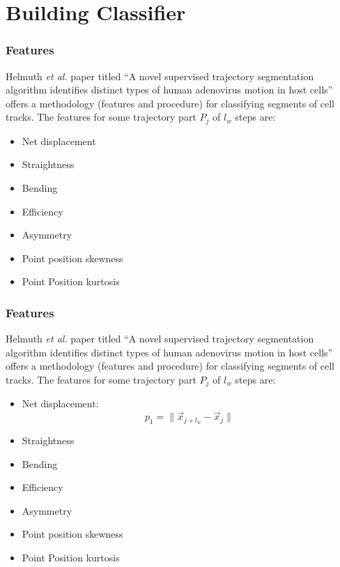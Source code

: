 \documentclass[8pt]{beamer}
\begin{document}
\section{Building Classifier}


\begin{frame}
  \frametitle{Features}
  Helmuth \emph{et al.} paper titled ``A novel supervised trajectory
  segmentation algorithm identifies distinct types of human adenovirus
  motion in host cells'' offers a methodology (features and procedure)
  for classifying segments of cell tracks.
  The features for some trajectory part $P_j$ of $l_w$ steps are:
  \begin{itemize}
  \item Net displacement
  \item Straightness
  \item Bending
  \item Efficiency
  \item Asymmetry
  \item Point position skewness
  \item Point Position kurtosis
  \end{itemize}
\end{frame}

\begin{frame}
  \frametitle{Features}
  Helmuth \emph{et al.} paper titled ``A novel supervised trajectory
  segmentation algorithm identifies distinct types of human adenovirus
  motion in host cells'' offers a methodology (features and procedure)
  for classifying segments of cell tracks.
  The features for some trajectory part $P_j$ of $l_w$ steps are:
  \begin{itemize}
  \item Net displacement: 
    \begin{equation*}
      p_1 = \| \vec{x}_{j+l_w} - \vec{x}_j \|
    \end{equation*}
  \item Straightness
  \item Bending
  \item Efficiency
  \item Asymmetry
  \item Point position skewness
  \item Point Position kurtosis
  \end{itemize}
\end{frame}
\end{document}
